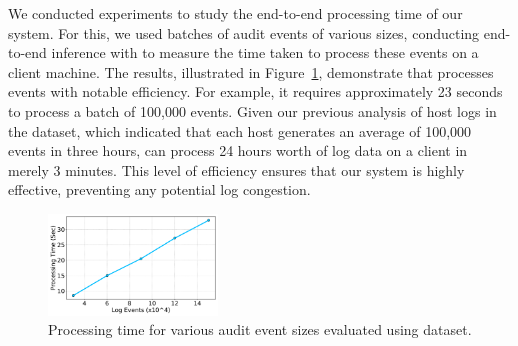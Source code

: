  We conducted experiments to study the end-to-end processing time of our system. For this, we used batches of audit events of various sizes, conducting end-to-end inference with \Sys to measure the time taken to process these events on a client machine. The results, illustrated in Figure~\ref{sizevstime}, demonstrate that \Sys processes events with notable efficiency. For example, it requires approximately 23 seconds to process a batch of 100,000 events. Given our previous analysis of host logs in the \optc dataset, which indicated that each host generates an average of 100,000 events in three hours, \Sys can process 24 hours worth of log data on a client in merely 3 minutes. This level of efficiency ensures that our system is highly effective, preventing any potential log congestion.

 \begin{figure}[!t]
  \centering
  \includegraphics[width=0.4\textwidth]{fig/sizevstime.pdf}
  \caption{Processing time for various audit event sizes evaluated using \optc dataset.}
  \label{sizevstime}
  \vspace{-2ex}
\end{figure}




